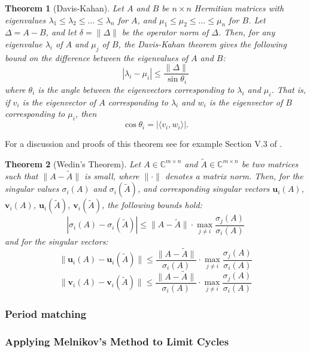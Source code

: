 \documentclass{article}
\newtheorem{theorem}{Theorem}
\theoremstyle{definition}
\theoremstyle{remark}
\newcounter{ct}
\begin{document}
\begin{theorem}[Davis-Kahan]
Let \( A \) and \( B \) be \( n \times n \) Hermitian matrices with eigenvalues \( \lambda_1 \leq \lambda_2 \leq \dots \leq \lambda_n \) for \( A \), and \( \mu_1 \leq \mu_2 \leq \dots \leq \mu_n \) for \( B \). Let \( \Delta = A - B \), and let \( \delta = \| \Delta \| \) be the operator norm of \( \Delta \). Then, for any eigenvalue \( \lambda_i \) of \( A \) and \( \mu_j \) of \( B \), the Davis-Kahan theorem gives the following bound on the difference between the eigenvalues of \( A \) and \( B \):
\[
|\lambda_i - \mu_i| \leq \frac{\| \Delta \|}{\sin \theta_i}
\]
where \( \theta_i \) is the angle between the eigenvectors corresponding to \( \lambda_i \) and \( \mu_i \). That is, if \( v_i \) is the eigenvector of \( A \) corresponding to \( \lambda_i \) and \( w_i \) is the eigenvector of \( B \) corresponding to \( \mu_i \), then
\[
\cos \theta_i = | \langle v_i, w_i \rangle |.
\]
\end{theorem}

For a discussion and proofs of this theorem see for example Section V.3 of \citet{stewart1990matrix}.


\begin{theorem}[Wedin's Theorem]
Let \( A \in \mathbb{C}^{m \times n} \) and \( \tilde{A} \in \mathbb{C}^{m \times n} \) be two matrices such that \( \| A - \tilde{A} \| \) is small, where \( \| \cdot \| \) denotes a matrix norm. Then, for the singular values \( \sigma_i(A) \) and \( \sigma_i(\tilde{A}) \), and corresponding singular vectors \( \mathbf{u}_i(A) \), \( \mathbf{v}_i(A) \), \( \mathbf{u}_i(\tilde{A}) \), \( \mathbf{v}_i(\tilde{A}) \), the following bounds hold:
\[
\left| \sigma_i(A) - \sigma_i(\tilde{A}) \right| \leq \| A - \tilde{A} \| \cdot \max_{j \neq i} \frac{\sigma_j(A)}{\sigma_i(A)}
\]
and for the singular vectors:
\[
\| \mathbf{u}_i(A) - \mathbf{u}_i(\tilde{A}) \| \leq \frac{\| A - \tilde{A} \|}{\sigma_i(A)} \cdot \max_{j \neq i} \frac{\sigma_j(A)}{\sigma_i(A)}
\]
\[
\| \mathbf{v}_i(A) - \mathbf{v}_i(\tilde{A}) \| \leq \frac{\| A - \tilde{A} \|}{\sigma_i(A)} \cdot \max_{j \neq i} \frac{\sigma_j(A)}{\sigma_i(A)}
\]
\end{theorem}



\subsubsection{Period matching}
\subsubsection{Applying Melnikov’s Method to Limit Cycles}
\end{document}
